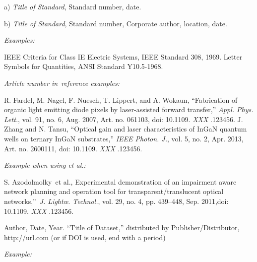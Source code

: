 \documentclass[journal,twoside,web]{ieeecolor}
\begin{document}

\noindent a) {\it Title of Standard}, Standard number, date.

\noindent b) {\it Title of Standard}, Standard number, Corporate author, location, date.

{\it Examples:}{\vadjust{\vspace*{-2.5em}}}

\begin{thebibliography}{00}
 IEEE Criteria for Class IE Electric Systems, IEEE Standard 308, 1969.
 Letter Symbols for Quantities, ANSI Standard Y10.5-1968.
\end{thebibliography}

{\it Article number in~reference examples:}{\vadjust{\vspace*{-2.5em}}}

\begin{thebibliography}{00}
 R. Fardel, M. Nagel, F. Nuesch, T. Lippert, and A. Wokaun, ``Fabrication of organic light emitting diode pixels by laser-assisted forward transfer,'' {\it Appl. Phys. Lett.}, vol. 91, no. 6, Aug. 2007, Art. no. 061103, doi:  {10.1109.} {{\it XXX}} {.123456}.
 J. Zhang and N. Tansu, ``Optical gain and laser characteristics of InGaN quantum wells on ternary InGaN substrates,'' {\it IEEE Photon. J.}, vol. 5, no. 2, Apr. 2013, Art. no. 2600111, doi:  {10.1109.} {{\it XXX}} {.123456}.
\end{thebibliography}

{\it Example when using \textit{et al.}:}{\vadjust{\vspace*{-2.5em}}}

\begin{thebibliography}{00}
 S. Azodolmolky~{{et al.}}, Experimental demonstration of an impairment aware network planning and operation tool for transparent/translucent optical networks,''~{\it J. Lightw. Technol.}, vol. 29, no. 4, pp. 439--448, Sep. 2011,doi:  {10.1109.} {{\it XXX}} {.123456}.
\end{thebibliography}


\noindent Author,  Date, Year. ``Title of Dataset,'' distributed by Publisher/Distributor, http://url.com (or if DOI is used, end with a period)

{\it Example:}{\vadjust{\vspace*{-2.5em}}}
\end{document}
